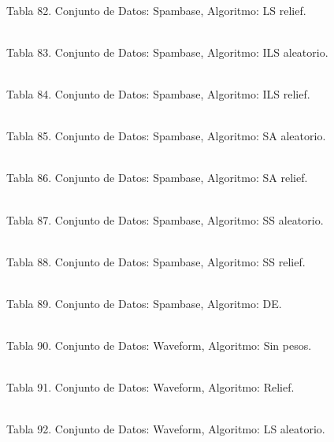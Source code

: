 \documentclass{ci5652}
\begin{document}
%
\\
Tabla 82. Conjunto de Datos: Spambase, Algoritmo: LS relief.

%
\\
Tabla 83. Conjunto de Datos: Spambase, Algoritmo: ILS aleatorio.

%
\\
Tabla 84. Conjunto de Datos: Spambase, Algoritmo: ILS relief.

%
\\
Tabla 85. Conjunto de Datos: Spambase, Algoritmo: SA aleatorio.

%
\\
Tabla 86. Conjunto de Datos: Spambase, Algoritmo: SA relief.

%
\\
Tabla 87. Conjunto de Datos: Spambase, Algoritmo: SS aleatorio.

%
\\
Tabla 88. Conjunto de Datos: Spambase, Algoritmo: SS relief.

%
\\
Tabla 89. Conjunto de Datos: Spambase, Algoritmo: DE.

%
\\
Tabla 90. Conjunto de Datos: Waveform, Algoritmo: Sin pesos.

%
\\
Tabla 91. Conjunto de Datos: Waveform, Algoritmo: Relief.

%
\\
Tabla 92. Conjunto de Datos: Waveform, Algoritmo: LS aleatorio.
\end{document}

